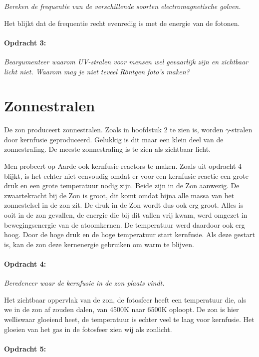 \emph{Bereken de frequentie van de verschillende soorten electromagnetische
golven.}

Het blijkt dat de frequentie recht evenredig is met de energie van
de fotonen.


\paragraph*{Opdracht 3:}

\emph{Beargumenteer waarom UV-stralen voor mensen wel gevaarlijk zijn
en zichtbaar licht niet. Waarom mag je niet teveel Röntgen foto's
maken?}


\section{Zonnestralen}

De zon produceert zonnestralen. Zoals in hoofdstuk 2 te zien is, worden
$\gamma$-stralen door kernfusie geproduceerd. Gelukkig is dit maar
een klein deel van de zonnestraling. De meeste zonnestraling is te
zien als zichtbaar licht.

Men probeert op Aarde ook kernfusie-reactors te maken. Zoals uit opdracht
4 blijkt, is het echter niet eenvoudig omdat er voor een kernfusie
reactie een grote druk en een grote temperatuur nodig zijn. Beide
zijn in de Zon aanwezig. De zwaartekracht bij de Zon is groot, dit
komt omdat bijna alle massa van het zonnestelsel in de zon zit. De
druk in de Zon wordt dus ook erg groot. Alles is ooit in de zon gevallen,
de energie die bij dit vallen vrij kwam, werd omgezet in bewegingsenergie
van de atoomkernen. De temperatuur werd daardoor ook erg hoog. Door
de hoge druk en de hoge temperatuur start kernfusie. Als deze gestart
is, kan de zon deze kernenergie gebruiken om warm te blijven.


\paragraph*{Opdracht 4:}

\emph{Beredeneer waar de kernfusie in de zon plaats vindt.}

Het zichtbaar oppervlak van de zon, de fotosfeer heeft een temperatuur
die, als we in de zon af zouden dalen, van 4500K naar 6500K oploopt.
De zon is hier welliswaar gloeiend heet, de temperatuur is echter
veel te laag voor kernfusie. Het gloeien van het gas in de fotosfeer
zien wij als zonlicht. 


\paragraph*{Opdracht 5:}

